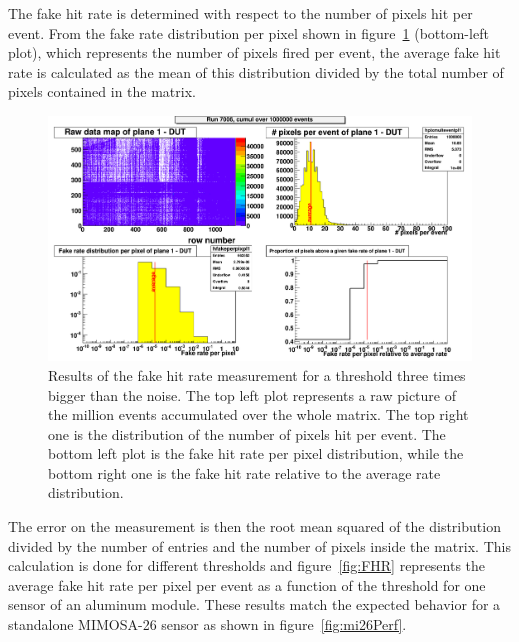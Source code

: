   The fake hit rate is determined with respect to the number of pixels hit per event.
  From the fake rate distribution per pixel shown in figure~\ref{fig:pixel/event} (bottom-left plot), which represents the number of pixels fired per event, the average fake hit rate is calculated as the mean of this distribution divided by the total number of pixels contained in the matrix.
  \begin{figure}[!tbh]
    \centering
    \includegraphics[width = \textwidth]{Pictures/labTests/FHR_AS01_chip3.png}
    \caption{Results of the fake hit rate measurement for a threshold three times bigger than the noise. The top left plot represents a raw picture of the million events accumulated over the whole matrix. The top right one is the distribution of the number of pixels hit per event. The bottom left plot is the fake hit rate per pixel distribution, while the bottom right one is the fake hit rate relative to the average rate distribution.}
    \label{fig:pixel/event}
  \end{figure}
  The error on the measurement is then the root mean squared of the distribution divided by the number of entries and the number of pixels inside the matrix.
  This calculation is done for different thresholds and figure~\ref{fig:FHR} represents the average fake hit rate per pixel per event as a function of the threshold for one sensor of an aluminum module.
  These results match the expected behavior for a standalone \gls{MIMOSA}-26 sensor as shown in figure~\ref{fig:mi26Perf}.

